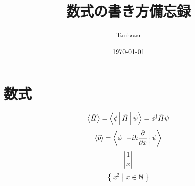 \documentclass[a4paper]{ltjsarticle}
\begin{document}
\title{数式の書き方備忘録}
\author{Tsubasa}
\date{\today}
\maketitle

\section{数式}

$$ \Braket{\bar{H}} = \Braket{\phi | \hat{H} | \psi } = \phi^\dagger \hat{H} \psi $$
$$ \Braket{\bar{p}} = \Braket{\phi | -i \hbar \frac{\partial}{\partial x} | \psi } $$
$$ \left\lvert \frac{1}{x} \right\rvert $$
$$ \Set{x^2 | x \in \mathbb{N} } $$

\end{document}
